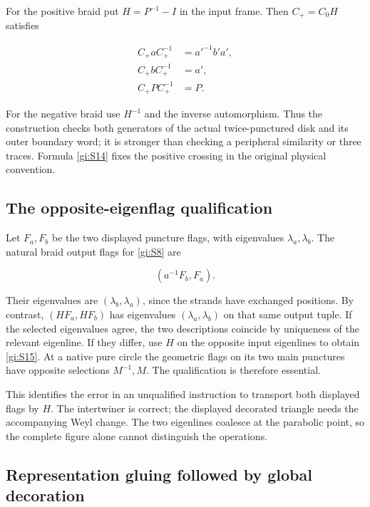 For the positive braid put \(H=P^{-1}-I\) in the input
frame. Then \(C_+=C_0H\) satisfies

\begin{equation}\label{gi:S14d}
\begin{aligned}
 C_+aC_+^{-1}&=a'^{-1}b'a',\\
 C_+bC_+^{-1}&=a',\\
 C_+PC_+^{-1}&=P .
\end{aligned}
\end{equation}

For the negative braid use \(H^{-1}\) and the inverse
automorphism. Thus the construction checks both generators of
the actual twice-punctured disk and its outer boundary word;
it is stronger than checking a peripheral similarity or three
traces. Formula \eqref{gi:S14} fixes the positive crossing in the
original physical convention.

\subsection{The opposite-eigenflag qualification}\label{gi:the-opposite-eigenflag-qualification}

Let \(F_a,F_b\) be the two displayed puncture flags, with
eigenvalues \(\lambda_a,\lambda_b\). The natural braid output
flags for \eqref{gi:S8} are

\begin{equation}\label{gi:S15}
(a^{-1}F_b,F_a).
\end{equation}

Their eigenvalues are \((\lambda_b,\lambda_a)\), since
the strands have exchanged positions. By contrast,
\((HF_a,HF_b)\) has eigenvalues
\((\lambda_a,\lambda_b)\) on that same output tuple.
If the selected eigenvalues agree, the two descriptions coincide
by uniqueness of the relevant eigenline. If they differ, use
\(H\) on the opposite input eigenlines to obtain \eqref{gi:S15}.
At a native pure circle the geometric flags on its two main
punctures have opposite selections \(M^{-1},M\).
The qualification is therefore essential.

This identifies the error in an unqualified instruction to
transport both displayed flags by \(H\). The intertwiner is
correct; the displayed decorated triangle needs the accompanying
Weyl change. The two eigenlines coalesce at the parabolic point,
so the complete figure alone cannot distinguish the operations.

\subsection{Representation gluing followed by global decoration}\label{gi:representation-gluing-followed-by-global-decoration}

